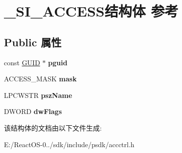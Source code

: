 \hypertarget{struct___s_i___a_c_c_e_s_s}{}\section{\+\_\+\+S\+I\+\_\+\+A\+C\+C\+E\+S\+S结构体 参考}
\label{struct___s_i___a_c_c_e_s_s}
\subsection*{Public 属性}
\begin{DoxyCompactItemize}
\item 
\mbox{\label{struct___s_i___a_c_c_e_s_s_a7ce0862ff6e4f8cbe47508a6aad6e873}} 
const \hyperlink{interface_g_u_i_d}{G\+U\+ID} $\ast$ {\bfseries pguid}
\item 
\mbox{\label{struct___s_i___a_c_c_e_s_s_a2878f3fc8323c5c8e20ace28c2f877c9}} 
A\+C\+C\+E\+S\+S\+\_\+\+M\+A\+SK {\bfseries mask}
\item 
\mbox{\label{struct___s_i___a_c_c_e_s_s_ae76a4a14d17654fb9ca88cf96c844941}} 
L\+P\+C\+W\+S\+TR {\bfseries psz\+Name}
\item 
\mbox{\label{struct___s_i___a_c_c_e_s_s_a71607f27b313ba4809f96978cf60932f}} 
D\+W\+O\+RD {\bfseries dw\+Flags}
\end{DoxyCompactItemize}


该结构体的文档由以下文件生成\+:\begin{DoxyCompactItemize}
\item 
E\+:/\+React\+O\+S-\/0../sdk/include/psdk/accctrl.\+h\end{DoxyCompactItemize}
